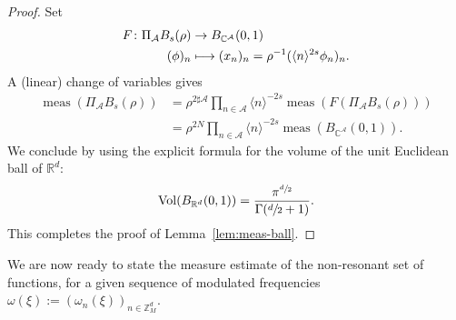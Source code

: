 \documentclass[10pt,a4paper]{amsart}
\newcommand\mto{\mathchoice{\longmapsto}{\mapsto}{\mapsto}{\mapsto}}
\theoremstyle{plain}
\theoremstyle{definition}
\DeclareMathOperator{\meas}{meas}
\DeclareMathOperator{\vol}{Vol}
\newcommand{\Z}{\mathbb{Z}}
\newcommand{\R}{\mathbb{R}}
\newcommand{\C}{\mathbb{C}}
\newcommand{\1}{\mathbf{1}}
\begin{document}
\begin{proof}
Set
\[
\begin{aligned}
F\colon \Pi_{\mathcal{A}}B_{s}(\rho)&\to B_{\C^{\mathcal{A}}}(0,1) \\
(\phi)_{n}&\mto (x_{n})_{n} = \rho^{-1}(\langle n\rangle^{2s}\phi_{n})_{n}.
\end{aligned}
\]
A (linear) change of variables gives
\begin{equation*}
\begin{split}
\meas(\Pi_{\mathcal{A}}B_{s}(\rho))
&= \rho^{2\sharp\mathcal{A}}
\prod_{n\in\mathcal{A}}\langle n\rangle^{-2s}
\meas(F(\Pi_{\mathcal{A}}B_{s}(\rho))) \\
&= \rho^{2N}\prod_{n\in\mathcal{A}}\langle n\rangle^{-2s} \meas(B_{\C^{\mathcal{A}}}(0,1)).
\end{split}
\end{equation*}
We conclude by using the explicit formula for the volume of the unit Euclidean ball of $\R^{d}$:
\[
\vol(B_{\R^{d}}(0,1)) = \frac{\pi^{\sfrac{d}{2}}}{\Gamma(\sfrac{d}{2}+1)}.
\]
This completes the proof of Lemma~\ref{lem:meas-ball}.
\end{proof}
We are now ready to state the measure estimate of the non-resonant set of functions, for a given sequence of modulated frequencies $\omega(\xi):=(\omega_{n}(\xi))_{n\in\Z_{M}^{d}}$.
\end{document}
